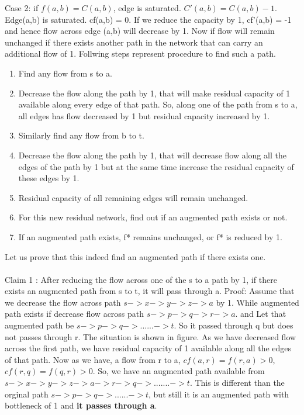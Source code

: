 	Case 2: if $f(a,b) = C(a,b)$, edge is saturated. $C'(a,b) = C(a,b) - 1$. 
	Edge(a,b) is saturated. cf(a,b) = 0. If we reduce the capacity by 1, cf'(a,b) = -1 and hence flow across edge (a,b) will decrease by 1. Now if flow will remain unchanged if there exists another path in the network that can carry an additional flow of 1. Follwing steps represent procedure to find such a path.
	\begin{enumerate}
	\item Find any flow from s to a. 
	\item Decrease the flow along the path by 1, that will make residual capacity of 1 available along every edge of that path. So, along one of the path from s to a, all edges has flow decreased by 1 but residual capacity increased by 1. 
	\item Similarly find any flow from b to t.
	\item Decrease the flow along the path by 1, that will decrease flow along all the edges of the path by 1 but at the same time increase the residual capacity of these edges by 1. 
	\item Residual capacity of all remaining edges will remain unchanged. 
	\item For this new residual network, find out if an augmented path exists or not.
	\item If an augmented path exists, f* remains unchanged, or f* is reduced by 1. 
	\end{enumerate}		
	
	Let us prove that this indeed find an augmented path if there exists one.	
	\\
	\\
	Claim 1 : After reducing the flow across one of the s to a path by 1, if there exists an augmented path from s to t, it will pass through a. 
	Proof:	
	Assume that we decrease the flow across path $s->x->y->z->a$  by 1. While augmented path exists if decrease flow across path $s->p->q->r->a$. and Let that augmented path be $s->p->q->......->t$. So it passed through q but does not passes through r.
	The situation is shown in figure. 
	As we have decreased flow across the first path, we have residual capacity of 1 available along all the edges of that path. Now as we have, a flow from r to a, $cf(a,r) = f(r,a) > 0$, $cf(r,q) = f(q,r) > 0$. So, we have an augmented path available from $s->x->y->z->a->r->q->.......->t$. This is different than the orginal path $s->p->q->......->t$, but still it is an augmented path with bottleneck of 1 and \textbf{it passes through a}. 
	
